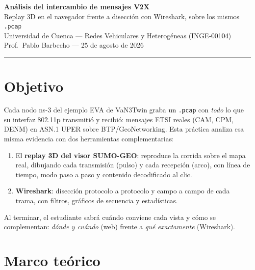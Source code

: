 \documentclass[11pt,a4paper]{article}
\begin{document}
\begin{center}
  {\color{azul}\LARGE\bfseries Análisis del intercambio de mensajes V2X}\\[4pt]
  {\color{gris}\large Replay 3D en el navegador frente a disección con Wireshark, sobre los mismos \texttt{.pcap}}\\[6pt]
  {\small Universidad de Cuenca --- Redes Vehiculares y Heterogéneas (INGE-00104)\\
  Prof.\ Pablo Barbecho --- 25 de agosto de 2026}
\end{center}

\vspace{2pt}\hrule\vspace{8pt}

\tableofcontents

\section{Objetivo}

Cada nodo ns-3 del ejemplo EVA de VaN3Twin graba un \texttt{.pcap} con
\emph{todo} lo que su interfaz 802.11p transmitió y recibió: mensajes ETSI
reales (CAM, CPM, DENM) en ASN.1 UPER sobre BTP/GeoNetworking. Esta práctica
analiza esa misma evidencia con dos herramientas complementarias:

\begin{enumerate}[leftmargin=1.6em, itemsep=2pt]
  \item El \textbf{replay 3D del visor SUMO-GEO}: reproduce la corrida sobre el
        mapa real, dibujando cada transmisión (pulso) y cada recepción (arco),
        con línea de tiempo, modo paso a paso y contenido decodificado al clic.
  \item \textbf{Wireshark}: disección protocolo a protocolo y campo a campo de
        cada trama, con filtros, gráficos de secuencia y estadísticas.
\end{enumerate}

Al terminar, el estudiante sabrá cuándo conviene cada vista y cómo se
complementan: \emph{dónde y cuándo} (web) frente a \emph{qué exactamente}
(Wireshark).

\section{Marco teórico}
\end{document}
